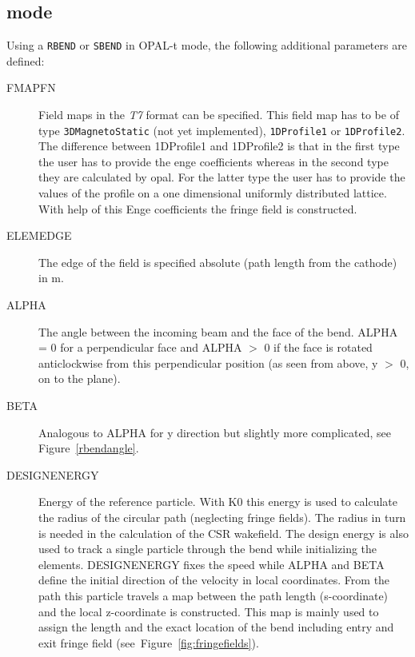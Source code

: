 \subsection{\opalt mode}
\label{sec:opalt:bend}
Using a \texttt{RBEND} or \texttt{SBEND} in OPAL-t mode, the following additional parameters are defined:
\begin{description}
\item[FMAPFN]
  Field maps in the {\em T7} format can be specified. This field map has to be of type \texttt{3DMagnetoStatic}
  (not yet implemented), \texttt{1DProfile1} or \texttt{1DProfile2}. The difference between 1DProfile1 and 1DProfile2
  is that in the first type the user has to provide the enge coefficients whereas in the second type they are
  calculated by opal. For the latter type the user has to provide the values of the profile on a one dimensional
  uniformly distributed lattice. With help of this Enge coefficients the fringe field is constructed.
\item[ELEMEDGE]
  The edge of the field is specified absolute (path length from the cathode) in m.
\item[ALPHA]
  The angle between the incoming beam and the face of the bend. ALPHA = 0 for a perpendicular face and ALPHA $>$ 0 if
  the face is rotated anticlockwise from this perpendicular position (as seen from above, y $>$ 0, on to the plane).
\item[BETA]
  Analogous to ALPHA for y direction but slightly more complicated, see Figure~\ref{rbendangle}.
\item[DESIGNENERGY]
  Energy of the reference particle. With K0 this energy is used to calculate the radius of the circular path (neglecting fringe fields). The radius in
  turn is needed in the calculation of the CSR wakefield. The design energy is also used to track a single particle through the bend while initializing the elements. DESIGNENERGY fixes the speed while ALPHA and BETA define the initial direction of the velocity in local coordinates. From the path this particle travels a map between the path length (s-coordinate) and the local z-coordinate is constructed. This map is mainly used to assign the length and the exact location of the bend including entry and exit fringe field (see~Figure~\ref{fig:fringefields}).
\end{description}
